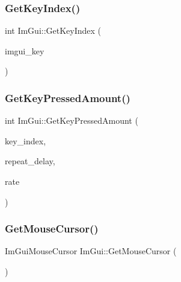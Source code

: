 \hypertarget{namespace_im_gui_a6cf235f0d0787d51a93f6d90e0bdff9b}{}\label{namespace_im_gui_a6cf235f0d0787d51a93f6d90e0bdff9b} 
\subsubsection{\texorpdfstring{Get\+Key\+Index()}{GetKeyIndex()}}
{\footnotesize\ttfamily int Im\+Gui\+::\+Get\+Key\+Index (\begin{DoxyParamCaption}\item[{Im\+Gui\+Key}]{imgui\+\_\+key }\end{DoxyParamCaption})}

\hypertarget{namespace_im_gui_ad94a09fc01052f02fe11bec5a3c11275}{}\label{namespace_im_gui_ad94a09fc01052f02fe11bec5a3c11275} 
\subsubsection{\texorpdfstring{Get\+Key\+Pressed\+Amount()}{GetKeyPressedAmount()}}
{\footnotesize\ttfamily int Im\+Gui\+::\+Get\+Key\+Pressed\+Amount (\begin{DoxyParamCaption}\item[{int}]{key\+\_\+index,  }\item[{float}]{repeat\+\_\+delay,  }\item[{float}]{rate }\end{DoxyParamCaption})}

\hypertarget{namespace_im_gui_a3b955bb840a2411f7c19ac6687d57392}{}\label{namespace_im_gui_a3b955bb840a2411f7c19ac6687d57392} 
\subsubsection{\texorpdfstring{Get\+Mouse\+Cursor()}{GetMouseCursor()}}
{\footnotesize\ttfamily Im\+Gui\+Mouse\+Cursor Im\+Gui\+::\+Get\+Mouse\+Cursor (\begin{DoxyParamCaption}{ }\end{DoxyParamCaption})}

\hypertarget{namespace_im_gui_a94b8aecab8a4128145fea1ad7d381197}{}\label{namespace_im_gui_a94b8aecab8a4128145fea1ad7d381197} 
